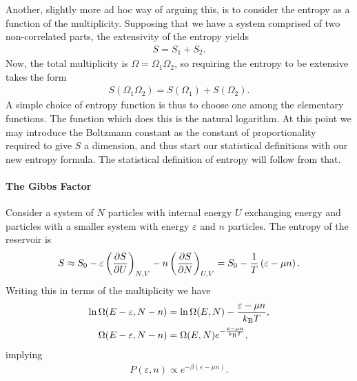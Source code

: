 Another, slightly more ad hoc way of arguing this, is to consider the entropy as a function of the multiplicity. Supposing that we have a system comprised of two non-correlated parts, the extensivity of the entropy yields
\begin{align*}
	S = S_{1} + S_{2}.
\end{align*}
Now, the total multiplicity is $\Omega = \Omega_{1}\Omega_{2}$, so requiring the entropy to be extensive takes the form
\begin{align*}
	S(\Omega_{1}\Omega_{2}) = S(\Omega_{1}) + S(\Omega_{2}).
\end{align*}
A simple choice of entropy function is thus to choose one among the elementary functions. The function which does this is the natural logarithm. At this point we may introduce the Boltzmann constant as the constant of proportionality required to give $S$ a dimension, and thus start our statistical definitions with our new entropy formula. The statistical definition of entropy will follow from that.

\paragraph{The Gibbs Factor}
Consider a system of $N$ particles with internal energy $U$ exchanging energy and particles with a smaller system with energy $\varepsilon$ and $n$ particles. The entropy of the reservoir is
\begin{align*}
	S \approx S_{0} - \varepsilon\left(\pdv{S}{U}\right)_{N, V} - n\left(\pdv{S}{N}\right)_{U, V} = S_{0} - \frac{1}{T}\left(\varepsilon - \mu n\right).
\end{align*}
Writing this in terms of the multiplicity we have
\begin{align*}
	\ln{\Omega(E - \varepsilon, N - n)} &= \ln{\Omega(E, N)} - \frac{\varepsilon - \mu n}{k_{\text{B}} T}, \\
	\Omega(E - \varepsilon, N - n)      &= \Omega(E, N)e^{-\frac{\varepsilon - \mu n}{k_{\text{B}} T}},
\end{align*}
implying
\begin{align*}
	P(\varepsilon, n) \propto e^{-\beta\left(\varepsilon - \mu n\right)}.
\end{align*}

